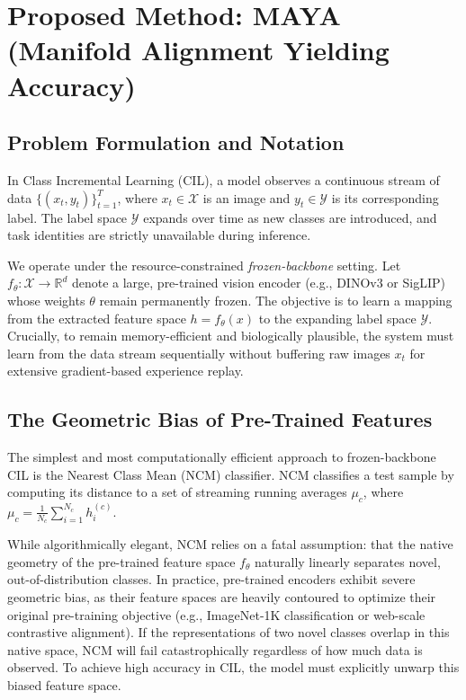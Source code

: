 \section{Proposed Method: MAYA (Manifold Alignment Yielding Accuracy)}
\label{sec:method}

\subsection{Problem Formulation and Notation}
\label{sec:method_formulation}
In Class Incremental Learning (CIL), a model observes a continuous stream of data $\{(x_t, y_t)\}_{t=1}^T$, where $x_t \in \mathcal{X}$ is an image and $y_t \in \mathcal{Y}$ is its corresponding label. The label space $\mathcal{Y}$ expands over time as new classes are introduced, and task identities are strictly unavailable during inference. 

We operate under the resource-constrained \textit{frozen-backbone} setting. Let $f_\theta: \mathcal{X} \rightarrow \mathbb{R}^d$ denote a large, pre-trained vision encoder (e.g., DINOv3 or SigLIP) whose weights $\theta$ remain permanently frozen. The objective is to learn a mapping from the extracted feature space $h = f_\theta(x)$ to the expanding label space $\mathcal{Y}$. Crucially, to remain memory-efficient and biologically plausible, the system must learn from the data stream sequentially without buffering raw images $x_t$ for extensive gradient-based experience replay.

\subsection{The Geometric Bias of Pre-Trained Features}
\label{sec:method_bias}
The simplest and most computationally efficient approach to frozen-backbone CIL is the Nearest Class Mean (NCM) classifier. NCM classifies a test sample by computing its distance to a set of streaming running averages $\mu_c$, where $\mu_c = \frac{1}{N_c} \sum_{i=1}^{N_c} h_i^{(c)}$.

While algorithmically elegant, NCM relies on a fatal assumption: that the native geometry of the pre-trained feature space $f_\theta$ naturally linearly separates novel, out-of-distribution classes. In practice, pre-trained encoders exhibit severe geometric bias, as their feature spaces are heavily contoured to optimize their original pre-training objective (e.g., ImageNet-1K classification or web-scale contrastive alignment). If the representations of two novel classes overlap in this native space, NCM will fail catastrophically regardless of how much data is observed. To achieve high accuracy in CIL, the model must explicitly unwarp this biased feature space.


